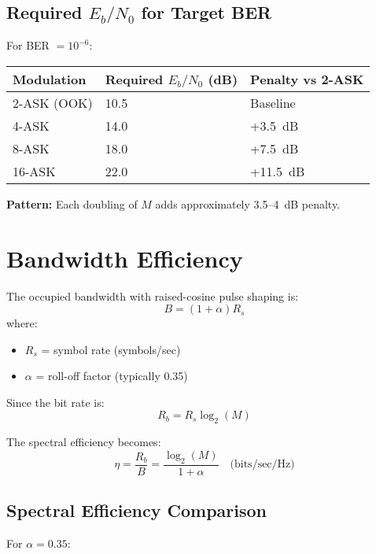 \subsection{Required $E_b/N_0$ for Target BER}

For BER $= 10^{-6}$:

\begin{center}
\begin{tabular}{@{}lll@{}}
\toprule
Modulation & Required $E_b/N_0$ (dB) & Penalty vs 2-ASK \\
\midrule
2-ASK (OOK) & 10.5 & Baseline \\
4-ASK & 14.0 & +3.5~dB \\
8-ASK & 18.0 & +7.5~dB \\
16-ASK & 22.0 & +11.5~dB \\
\bottomrule
\end{tabular}
\end{center}

\textbf{Pattern:} Each doubling of $M$ adds approximately 3.5--4~dB penalty.

\section{Bandwidth Efficiency}

The occupied bandwidth with raised-cosine pulse shaping is:
\begin{equation}
B = (1 + \alpha) R_s
\end{equation}
where:
\begin{itemize}
\item $R_s$ = symbol rate (symbols/sec)
\item $\alpha$ = roll-off factor (typically 0.35)
\end{itemize}

Since the bit rate is:
\begin{equation}
R_b = R_s \log_2(M)
\end{equation}

The spectral efficiency becomes:
\begin{equation}
\eta = \frac{R_b}{B} = \frac{\log_2(M)}{1 + \alpha} \quad \text{(bits/sec/Hz)}
\end{equation}

\subsection{Spectral Efficiency Comparison}

For $\alpha = 0.35$:

